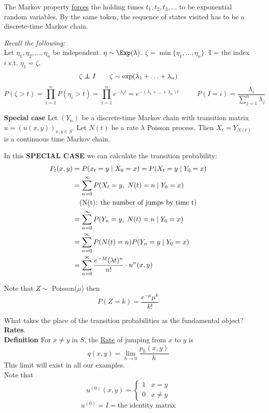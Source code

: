 \documentclass[12pt]{article}
\begin{document}
The Markov property \underline{forces} the holding times $t_1,t_2,t_3,...$ to be exponential random variables. By the same token, the sequence of states visited has to be a discrete-time Markov chain.

\vspace{1\baselineskip}
{\sl Recall the following:}\\
Let $\eta_1,\eta_2,...,\eta_n$ be independent. $\eta\sim\Exp(\lambda)$. $\zeta = \min\{\eta_1,...,\eta_n\}$. I = the index $i$ s.t. $\eta_1 = \zeta$.
$$\zeta \independent I \qquad \zeta\sim\exp(\lambda_1+\ldots+\lambda_n)$$
$$P(\zeta>t)=\prod\limits_{i=1}^n P(\eta_i > t) = \prod\limits_{i=1}^n e^{-\lambda_i t} = e^{-(\lambda_1+\ldots+\lambda_n)t}\qquad\;\;
P(I=i) = \frac{\lambda_i}{\sum\limits_{j=1}^n \lambda_j}$$

\newpage
{\bf Special case} Let $(Y_n)$ be a discrete-time Markov chain with transition matrix $u=(u(x,y))_{x,y\in S}$. Let $N(t)$ be a rate $\lambda$ Poisson process. Then $X_t = Y_{N(t)}$ is a continuous time Markov chain.

In this {\bf SPECIAL CASE} we can calculate the transition probability:
\begin{align}
    P_t(x,y) &= P(x_t=y\;|\;X_0=x) = P(X_t=y\;|\;Y_0=x) \nonumber \\
    &=\sum\limits_{n=0}^\infty P(X_t=y,\;N(t)=n\;|\;Y_0=x) \nonumber \\
    &\text{\quad (N(t): the number of jumps by time t)} \nonumber \\
    &=\sum\limits_{n=0}^\infty P(Y_n=y,\;N(t)=n\;|\;Y_0=x) \nonumber \\ 
    &=\sum\limits_{n=0}^\infty P(N(t)=n)P(Y_n=y\;|\;Y_0=x) \nonumber \\
    &= \sum\limits_{n=0}^\infty \frac{e^{-\lambda t} (\lambda t)^n}{n!} \cdot u^n(x,y) \nonumber
\end{align}

Note that $Z\sim$ Poisson($\mu$) then
$$P(Z=k) = \frac{e^{-\mu}\mu^k}{k!}$$

\vspace{1\baselineskip}
What takes the place of the transition probabilities as the fundamental object? {\bf Rates}.\\

{\bf Definition} For $x\neq y$ in $S$, the \underline{Rate} of jumping from $x$ to $y$ is 
$$q(x,y)=\lim\limits_{h\to 0} \frac{p_h(x,y)}{h}$$
This limit will exist in all our examples. \\

\vspace{1\baselineskip}
Note that 
$$u^{(0)}(x,y) = \begin{cases} 1&x=y\\0&x\neq y\end{cases}$$
$$u^{(0)} = I = \text{the identity matrix}$$
\end{document}
